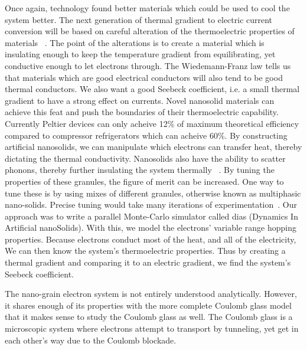 	Once again, technology found better materials which could be used to cool the system better. The next generation of thermal gradient to electric current conversion will be based on careful alteration of the thermoelectric properties of materials ~\cite{Sparks16}. The point of the alterations is to create a material which is insulating enough to keep the temperature gradient from equilibrating, yet conductive enough to let electrons through. The Wiedemann-Franz law tells us that materials which are good electrical conductors will also tend to be good thermal conductors. We also want a good Seebeck coefficient, i.e. a small thermal gradient to have a strong effect on currents. Novel nanosolid materials can achieve this feat and push the boundaries of their thermoelectric capability. Currently Peltier devices can only acheive 12\% of maximum theoretical efficiency compared to compressor refrigerators which can acheive 60\%. By constructing artificial nanosolids, we can manipulate which electrons can transfer heat, thereby dictating the thermal conductivity. Nanosolids also have the ability to scatter phonons, thereby further insulating the system thermally ~\cite{glatz09}. By tuning the properties of these granules, the figure of merit can be increased. One way to tune these is by using mixes of different granules, otherwise known as multiphasic nano-solids. Precise tuning would take many iterations of experimentation~\cite{Sparks16}. Our approach was to write a parallel Monte-Carlo simulator called {\sc dias} (Dynamics In Artificial nanoSolids). With this, we model the electrons' variable range hopping properties. Because electrons conduct most of the heat, and all of the electricity, We can then know the system's thermoelectric properties. Thus by creating a thermal gradient and comparing it to an electric gradient, we find the system's Seebeck coefficient. 

The nano-grain electron system is not entirely understood analytically. However, it shares enough of its properties with the more complete Coulomb glass model that it makes sense to study the Coulomb glass as well. The Coulomb glass is a microscopic system where electrons attempt to transport by tunneling, yet get in each other's way due to the Coulomb blockade. 

